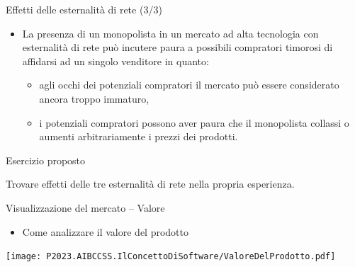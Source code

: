 \documentclass{beamer}
\begin{document}
\begin{frame}
{\centerline{Effetti delle esternalit\`{a} di rete (3/3)}}

\begin{itemize}

\item La presenza di un monopolista in un mercato ad alta tecnologia con esternalit\`{a} di rete pu\`{o} incutere paura a possibili compratori timorosi di affidarsi ad un singolo venditore in quanto:
\begin{itemize}
\item agli occhi dei potenziali compratori il mercato pu\`{o} essere considerato ancora troppo immaturo,
\item i potenziali compratori possono aver paura che il monopolista collassi o aumenti arbitrariamente i prezzi dei prodotti.
\end{itemize}

\end{itemize}

\end{frame}


\begin{frame}
{\centerline{Esercizio proposto}}
\vspace{1cm}
\begin{center}
    \LARGE{Trovare effetti delle tre esternalit\`{a} di rete nella propria esperienza.}
\end{center}

\end{frame}

\begin{frame}
{\centerline{Visualizzazione del mercato -- Valore}}
\begin{itemize}
    \item Come analizzare il valore del prodotto
\end{itemize} 
\begin{center}
    \texttt{[image: P2023.AIBCCSS.IlConcettoDiSoftware/ValoreDelProdotto.pdf]}
\end{center}

\end{frame}
\end{document}
